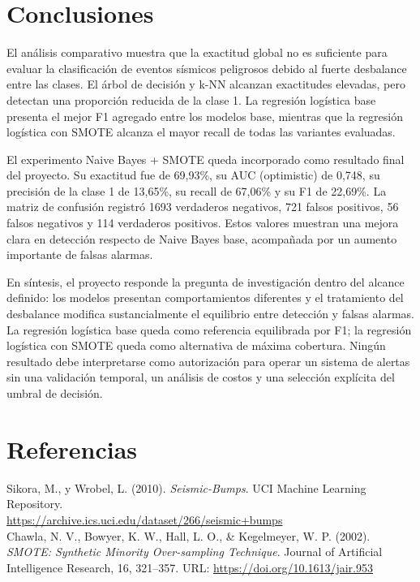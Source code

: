 \documentclass[12pt,a4paper]{article}
\begin{document}
\section{Conclusiones}
El análisis comparativo muestra que la exactitud global no es suficiente para evaluar la clasificación de eventos sísmicos peligrosos debido al fuerte desbalance entre las clases. El árbol de decisión y k-NN alcanzan exactitudes elevadas, pero detectan una proporción reducida de la clase 1. La regresión logística base presenta el mejor F1 agregado entre los modelos base, mientras que la regresión logística con SMOTE alcanza el mayor recall de todas las variantes evaluadas.

El experimento Naive Bayes + SMOTE queda incorporado como resultado final del proyecto. Su exactitud fue de 69,93\%, su AUC (optimistic) de 0,748, su precisión de la clase 1 de 13,65\%, su recall de 67,06\% y su F1 de 22,69\%. La matriz de confusión registró 1693 verdaderos negativos, 721 falsos positivos, 56 falsos negativos y 114 verdaderos positivos. Estos valores muestran una mejora clara en detección respecto de Naive Bayes base, acompañada por un aumento importante de falsas alarmas.

En síntesis, el proyecto responde la pregunta de investigación dentro del alcance definido: los modelos presentan comportamientos diferentes y el tratamiento del desbalance modifica sustancialmente el equilibrio entre detección y falsas alarmas. La regresión logística base queda como referencia equilibrada por F1; la regresión logística con SMOTE queda como alternativa de máxima cobertura. Ningún resultado debe interpretarse como autorización para operar un sistema de alertas sin una validación temporal, un análisis de costos y una selección explícita del umbral de decisión.

\section{Referencias}
Sikora, M., y Wrobel, L. (2010). \textit{Seismic-Bumps}. UCI Machine Learning Repository.\\
\url{https://archive.ics.uci.edu/dataset/266/seismic+bumps}\\
Chawla, N. V., Bowyer, K. W., Hall, L. O., \& Kegelmeyer, W. P. (2002). \textit{SMOTE: Synthetic Minority Over-sampling Technique}. Journal of Artificial Intelligence Research, 16, 321--357. URL: \url{https://doi.org/10.1613/jair.953}
\end{document}
